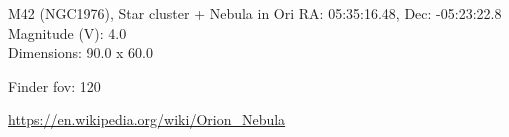 \begin{block}{M42 (NGC1976), Star cluster + Nebula in Ori}
    RA: 05:35:16.48, Dec: -05:23:22.8 \\ 
    Magnitude (V): 4.0 \\ 
    Dimensions: 90.0 x 60.0 

    Finder fov: 120 

    \url{https://en.wikipedia.org/wiki/Orion_Nebula} 
\end{block}